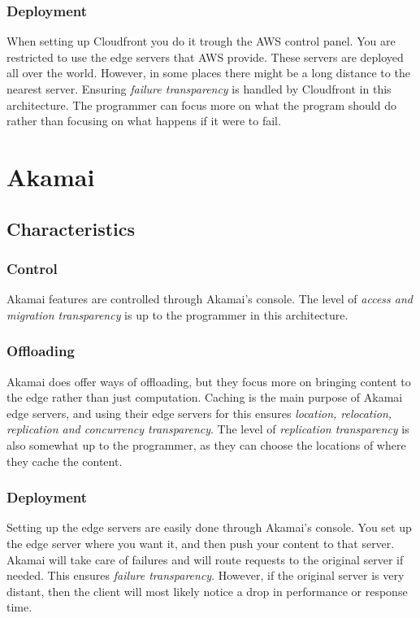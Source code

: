 \subsubsection{Deployment}
When setting up Cloudfront you do it trough the AWS control panel. You are restricted to use the edge servers that AWS provide. These servers are deployed all over the world. However, in some places there might be a long distance to the nearest server. Ensuring \textit{failure transparency} is handled by Cloudfront in this architecture. The programmer can focus more on what the program should do rather than focusing on what happens if it were to fail. 









\section{Akamai}
\subsection{Characteristics}
\subsubsection{Control}
Akamai features are controlled through Akamai's console. The level of \textit{access and migration transparency} is up to the programmer in this architecture.

\subsubsection{Offloading}
Akamai does offer ways of offloading, but they focus more on bringing content to the edge rather than just computation. Caching is the main purpose of Akamai edge servers, and using their edge servers for this ensures \textit{location, relocation, replication and concurrency transparency}. The level of \textit{replication transparency} is also somewhat up to the programmer, as they can choose the locations of where they cache the content.

\subsubsection{Deployment}
Setting up the edge servers are easily done through Akamai's console. You set up the edge server where you want it, and then push your content to that server. Akamai will take care of failures and will route requests to the original server if needed. This ensures \textit{failure transparency}. However, if the original server is very distant, then the client will most likely notice a drop in performance or response time.


